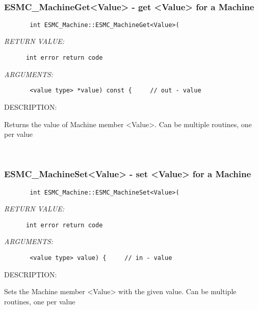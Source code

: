  
\mbox{}\hrulefill\ 
 
\subsubsection{ESMC\_MachineGet<Value> - get <Value> for a Machine}


  
\begin{verbatim}       int ESMC_Machine::ESMC_MachineGet<Value>(\end{verbatim}{\em RETURN VALUE:}
\begin{verbatim}      int error return code\end{verbatim}{\em ARGUMENTS:}
\begin{verbatim}       <value type> *value) const {     // out - value\end{verbatim}
{\sf DESCRIPTION:\\ }


       Returns the value of Machine member <Value>.
       Can be multiple routines, one per value
   
 
\mbox{}\hrulefill\ 
 
\subsubsection{ESMC\_MachineSet<Value> - set <Value> for a Machine}


  
\begin{verbatim}       int ESMC_Machine::ESMC_MachineSet<Value>(\end{verbatim}{\em RETURN VALUE:}
\begin{verbatim}      int error return code\end{verbatim}{\em ARGUMENTS:}
\begin{verbatim}       <value type> value) {     // in - value\end{verbatim}
{\sf DESCRIPTION:\\ }


       Sets the Machine member <Value> with the given value.
       Can be multiple routines, one per value
   
 
